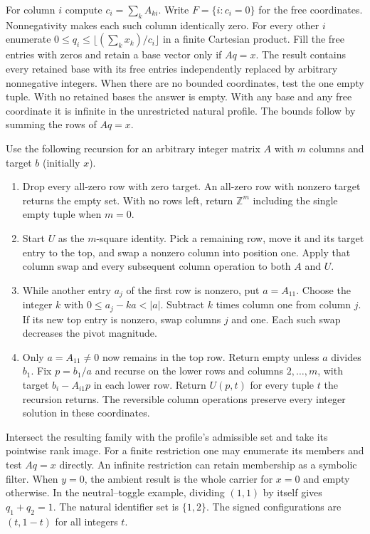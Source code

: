 For column $i$ compute $c_i=\sum_k A_{ki}$. Write $F=\{i:c_i=0\}$ for the free coordinates. Nonnegativity makes each such column identically zero. For every other $i$ enumerate $0\le q_i\le\lfloor(\sum_k x_k)/c_i\rfloor$ in a finite Cartesian product. Fill the free entries with zeros and retain a base vector only if $Aq=x$. The result contains every retained base with its free entries independently replaced by arbitrary nonnegative integers. When there are no bounded coordinates, test the one empty tuple. With no retained bases the answer is empty. With any base and any free coordinate it is infinite in the unrestricted natural profile. The bounds follow by summing the rows of $Aq=x$.

Use the following recursion for an arbitrary integer matrix $A$ with $m$ columns and target $b$ (initially $x$).
\begin{enumerate}\setlength{\itemsep}{0pt}\setlength{\topsep}{2pt}
\item Drop every all-zero row with zero target. An all-zero row with nonzero target returns the empty set. With no rows left, return $\mathbb Z^m$ including the single empty tuple when $m=0$.
\item Start $U$ as the $m$-square identity. Pick a remaining row, move it and its target entry to the top, and swap a nonzero column into position one. Apply that column swap and every subsequent column operation to both $A$ and $U$.
\item While another entry $a_j$ of the first row is nonzero, put $a=A_{11}$. Choose the integer $k$ with $0\le a_j-ka<|a|$. Subtract $k$ times column one from column $j$. If its new top entry is nonzero, swap columns $j$ and one. Each such swap decreases the pivot magnitude.
\item Only $a=A_{11}\ne0$ now remains in the top row. Return empty unless $a$ divides $b_1$. Fix $p=b_1/a$ and recurse on the lower rows and columns $2,\ldots,m$, with target $b_i-A_{i1}p$ in each lower row. Return $U(p,t)$ for every tuple $t$ the recursion returns. The reversible column operations preserve every integer solution in these coordinates.
\end{enumerate}

Intersect the resulting family with the profile's admissible set and take its pointwise rank image. For a finite restriction one may enumerate its members and test $Aq=x$ directly. An infinite restriction can retain membership as a symbolic filter. When $y=0$, the ambient result is the whole carrier for $x=0$ and empty otherwise. In the neutral--toggle example, dividing $(1,1)$ by itself gives $q_1+q_2=1$. The natural identifier set is $\{1,2\}$. The signed configurations are $(t,1-t)$ for all integers $t$.
\endgroup

